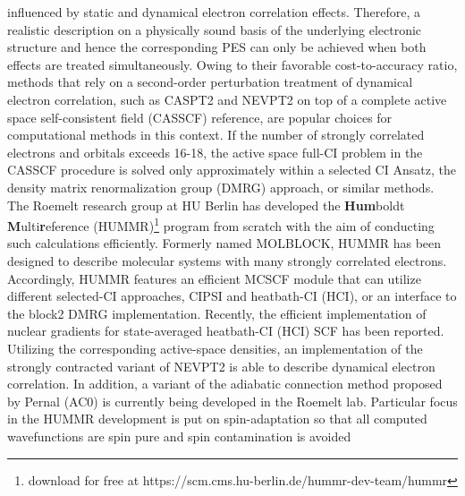 \documentclass[a4paper,11pt,headings=normal]{scrartcl}
\begin{document}
\begin{itemize}
influenced by static and dynamical electron correlation effects. Therefore, a 
realistic description on a physically sound basis of the underlying electronic 
structure and hence the corresponding PES can only be achieved when both 
effects are treated simultaneously. 
Owing to their favorable cost-to-accuracy ratio, methods that rely on a 
second-order perturbation treatment of dynamical electron correlation, such as 
CASPT2\autocite{Roos1992} and NEVPT2\autocite{Malrieu2002} on top of a complete 
active space self-consistent field (CASSCF) reference, are popular choices for 
computational methods in this context. If the number of strongly correlated 
electrons and orbitals exceeds 16-18, the active space full-CI problem in the 
CASSCF procedure is solved only approximately within a selected CI 
Ansatz,\autocite{Evangelista2016, Umrigar2016a, 
HeadGordon2020, Neese2021, Hoffmann2020, Roemelt2023} the density matrix 
renormalization group (DMRG) approach\autocite{Chan2016c, 
Reiher2020}, or similar methods. The Roemelt research group at HU Berlin has 
developed the \textbf{Hum}boldt \textbf{M}ulti\textbf{r}eference 
(HUMMR)\footnote{download for free at 
https://scm.cms.hu-berlin.de/hummr-dev-team/hummr} 
program from scratch with the aim of conducting such calculations 
efficiently.\autocite{Roemelt2019} Formerly named MOLBLOCK, HUMMR has been 
designed to describe molecular systems with many strongly correlated electrons. 
Accordingly, HUMMR features an efficient MCSCF module that can utilize 
different selected-CI approaches, CIPSI and heatbath-CI 
(HCI),\autocite{Roemelt2023}  or an interface to the block2 DMRG 
implementation.\autocite{Chan2023} Recently, the efficient  
implementation of nuclear gradients for state-averaged heatbath-CI (HCI) SCF has 
been reported.\autocite{Roemelt2025} Utilizing the corresponding active-space 
densities, an implementation of the strongly contracted variant of 
NEVPT2 is able to describe dynamical electron 
correlation.\autocite{Pantazis2018, Roemelt2020a} In addition, a variant of the 
adiabatic connection method proposed by Pernal (AC0)\autocite{Pernal2024} is 
currently being developed in the Roemelt lab. Particular focus 
in the HUMMR development is put on spin-adaptation\autocite{Roemelt2022} so 
that all computed wavefunctions are spin pure and spin contamination is avoided 

\end{itemize}
\end{document}
